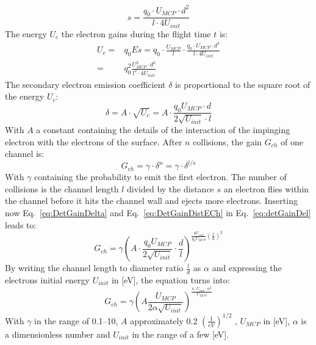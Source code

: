 	\begin{equation}
		s = \frac{q_0 \cdot U_{MCP}\cdot d^2}{l\cdot 4U_{init}}
		\label{eq:DetGainDistECh}
	\end{equation}
	The energy $U_c$ the electron gains during the flight time $t$ is:
	\begin{align}
		U_c =& q_0 Es = q_0\cdot \frac{U_{MCP}}{l}\cdot\frac{q_0\cdot U_{MCP}\cdot d^2}{l\cdot 4 U_{init}}\\
		=& q_0^2 \frac{U_{MCP}^2\cdot d^2}{l^2\cdot 4U_{init}}
	\end{align}
	The secondary electron emission coefficient $\delta$ is proportional to the square root of the energy $U_c$:
	\begin{equation}
		\delta = A\cdot \sqrt{U_c} = A\cdot \frac{q_0 U_{MCP}\cdot d}{2 \sqrt{U_{init}}\cdot l}
		\label{eq:DetGainDelta}
	\end{equation}
	With $A$ a constant containing the details of the interaction of the impinging electron with the electrons of the surface. After $n$ collisions, the gain $G_{ch}$ of one channel is:
	\begin{equation}
		G_{ch} = \gamma\cdot\delta^{n} = \gamma\cdot\delta^{l/s}
		\label{eq:detGainDel}
	\end{equation}
	With $\gamma$ containing the probability to emit the first electron. The number of collisions is the channel length $l$ divided by the distance $s$ an electron flies within the channel before it hits the channel wall and ejects more electrons. Inserting now Eq.~\eqref{eq:DetGainDelta} and Eq.~\eqref{eq:DetGainDistECh} in Eq.~\eqref{eq:detGainDel} leads to:
	\begin{equation}
		G_{ch} = \gamma\left(A\cdot\frac{q_0 U_{MCP}}{2\sqrt{U_{init}}}\cdot\frac{d}{l}\right) ^{\frac{4U_{init}}{q_0 U_{MCP}}\left(\frac{l}{d}\right)^2}
	\end{equation}
	By writing the channel length to diameter ratio $\frac{l}{d}$ as $\alpha$ and expressing the electrons initial energy $U_{init}$ in [eV], the equation turns into:
	\begin{equation}
		G_{ch} = \gamma\left(A\frac{U_{MCP}}{2\alpha\sqrt{U_{init}}}\right)^{\frac{4\cdot U_{init}\cdot\alpha^2}{U_{MCP}}}
		\label{eq:MCPGain}
	\end{equation}
	With $\gamma$ in the range of 0.1--10, $A$ approximately 0.2 $\left(\frac{1}{eV}\right)^{1/2}$ \cite{Wiza_1979_MCP}, $U_{MCP}$ in [eV], $\alpha$ is a dimensionless number and $U_{init}$ in the range of a few [eV].
	
	
